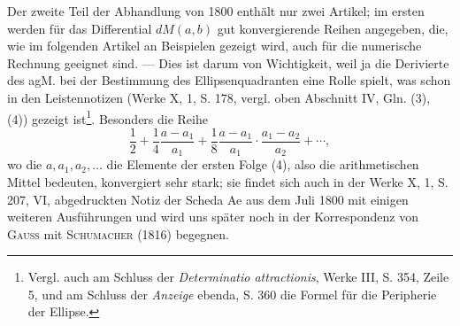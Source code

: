 Der zweite Teil der Abhandlung von 1800 enthält nur zwei Artikel; im
ersten werden für das Differential \(dM(a,b)\) gut konvergierende Reihen angegeben,
die, wie im folgenden Artikel an Beispielen gezeigt wird, auch für
die numerische Rechnung geeignet sind. — Dies ist darum von Wichtigkeit,
weil ja die Derivierte des agM. bei der Bestimmung des Ellipsenquadranten
eine Rolle spielt, was schon in den Leistennotizen (Werke X, 1, S. 178, vergl.
oben Abschnitt IV, Gln. (3), (4)) gezeigt ist\footnote{Vergl. auch am Schluss der \textit{Determinatio attractionis}, Werke III, S. 354, Zeile 5, und am Schluss der \textit{Anzeige} ebenda, S. 360 die Formel für die Peripherie der Ellipse.}. Besonders die Reihe
\[
\frac12+\frac14\frac{a-a_1}{a_1}+\frac18\frac{a-a_1}{a_1}\cdot\frac{a_1-a_2}{a_2}+\cdots,
\]
\noindent wo die \(a,a_1,a_2,\ldots\) die Elemente der ersten Folge (4), also die arithmetischen
Mittel bedeuten, konvergiert sehr stark; sie findet sich auch in der Werke
X, 1, S. 207, VI, abgedruckten Notiz der Scheda Ae aus dem Juli 1800 mit
einigen weiteren Ausführungen und wird uns später noch in der Korrespondenz
von \textsc{Gauss} mit \textsc{Schumacher} (1816) begegnen.

